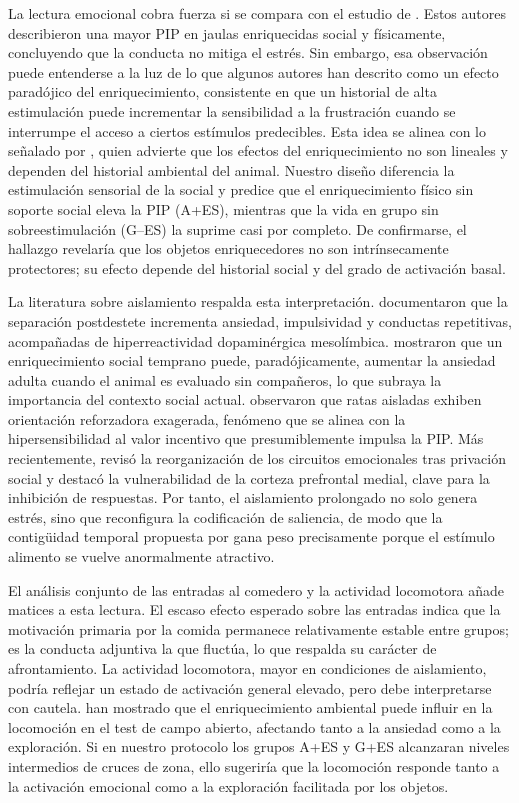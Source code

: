 \documentclass[12pt,a4paper]{article}
\begin{document}
\begin{multicols}{2}
La lectura emocional cobra fuerza si se compara con el estudio de \citet{FuentesVerdugo2023}. Estos autores describieron una mayor PIP en jaulas enriquecidas social y físicamente, concluyendo que la conducta no mitiga el estrés. Sin embargo, esa observación puede entenderse a la luz de lo que algunos autores han descrito como un efecto paradójico del enriquecimiento, consistente en que un historial de alta estimulación puede incrementar la sensibilidad a la frustración cuando se interrumpe el acceso a ciertos estímulos predecibles. Esta idea se alinea con lo señalado por \citet{Wurbel2001}, quien advierte que los efectos del enriquecimiento no son lineales y dependen del historial ambiental del animal. Nuestro diseño diferencia la estimulación sensorial de la social y predice que el enriquecimiento físico sin soporte social eleva la PIP (A+ES), mientras que la vida en grupo sin sobreestimulación (G--ES) la suprime casi por completo. De confirmarse, el hallazgo revelaría que los objetos enriquecedores no son intrínsecamente protectores; su efecto depende del historial social y del grado de activación basal.

La literatura sobre aislamiento respalda esta interpretación. \citet{Fone2008} documentaron que la separación postdestete incrementa ansiedad, impulsividad y conductas repetitivas, acompañadas de hiperreactividad dopaminérgica mesolímbica. \citet{Branchi2006} mostraron que un enriquecimiento social temprano puede, paradójicamente, aumentar la ansiedad adulta cuando el animal es evaluado sin compañeros, lo que subraya la importancia del contexto social actual. \citet{Robbins1989} observaron que ratas aisladas exhiben orientación reforzadora exagerada, fenómeno que se alinea con la hipersensibilidad al valor incentivo que presumiblemente impulsa la PIP. Más recientemente, \citet{Arakawa2018} revisó la reorganización de los circuitos emocionales tras privación social y destacó la vulnerabilidad de la corteza prefrontal medial, clave para la inhibición de respuestas. Por tanto, el aislamiento prolongado no solo genera estrés, sino que reconfigura la codificación de saliencia, de modo que la contigüidad temporal propuesta por \citet{Killeen2013} gana peso precisamente porque el estímulo alimento se vuelve anormalmente atractivo.

El análisis conjunto de las entradas al comedero y la actividad locomotora añade matices a esta lectura. El escaso efecto esperado sobre las entradas indica que la motivación primaria por la comida permanece relativamente estable entre grupos; es la conducta adjuntiva la que fluctúa, lo que respalda su carácter de afrontamiento. La actividad locomotora, mayor en condiciones de aislamiento, podría reflejar un estado de activación general elevado, pero debe interpretarse con cautela. \citet{seibenhener2015use} han mostrado que el enriquecimiento ambiental puede influir en la locomoción en el test de campo abierto, afectando tanto a la ansiedad como a la exploración. Si en nuestro protocolo los grupos A+ES y G+ES alcanzaran niveles intermedios de cruces de zona, ello sugeriría que la locomoción responde tanto a la activación emocional como a la exploración facilitada por los objetos.


\end{multicols}
\end{document}

